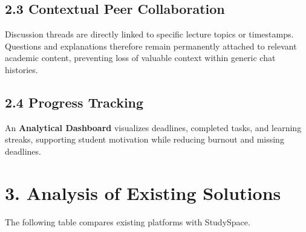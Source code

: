 \documentclass[11pt, a4paper]{article}
\begin{document}
\subsection{2.3 Contextual Peer Collaboration}
Discussion threads are directly linked to specific lecture topics or timestamps. Questions and explanations therefore remain permanently attached to relevant academic content, preventing loss of valuable context within generic chat histories.

\subsection{2.4 Progress Tracking}
An \textbf{Analytical Dashboard} visualizes deadlines, completed tasks, and learning streaks, supporting student motivation while reducing burnout and missing deadlines.

\section{3. Analysis of Existing Solutions}
The following table compares existing platforms with StudySpace.
\end{document}
